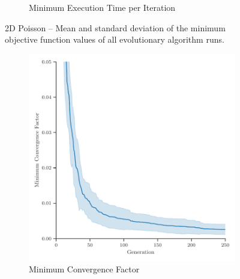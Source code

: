 \begin{figure}[h]
\begin{subfigure}[b]{0.49\textwidth}
		\caption{Minimum Execution Time per Iteration}
		\label{fig:poisson-2D-minimum-execution-time}
	\end{subfigure}
	\caption[2D Poisson -- Mean and standard deviation of the minimum objective function values]{2D Poisson -- Mean and standard deviation of the minimum objective function values of all evolutionary algorithm runs.}
	\label{fig:poisson-2D-minimum-objectives}
\end{figure}
\begin{figure}
	\centering
	\begin{subfigure}[b]{0.49\textwidth}
		\centering
		\includegraphics[width=\textwidth]{figures/minimum_convergence_factor_3D_FD_Poisson_fromL2.pdf}
		\caption{Minimum Convergence Factor}
		\label{fig:poisson-3D-minimum-convergence-factor}
	\end{subfigure}
	\hfill
	\begin{subfigure}[b]{0.49\textwidth}
		\centering

\end{subfigure}
\end{figure}
